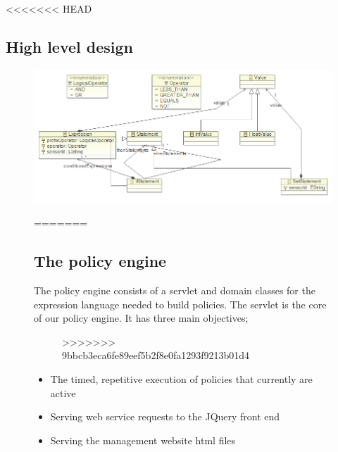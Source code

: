 <<<<<<< HEAD
\subsection{High level design}
\begin{figure}[t]
\includegraphics[width=1.00\columnwidth]{model.png}
\caption{Model}
=======
\subsection{The policy engine}
The policy engine consists of a servlet and domain classes for the expression language needed to build policies. The servlet is the core of our policy engine. It has three main objectives;

\begin{figure}[b]
>>>>>>> 9bbcb3eca6fe89eef5b2f8e0fa1293f9213b01d4
\end{figure}

\begin{itemize}
	\item The timed, repetitive execution of policies that currently are active
	\item Serving web service requests to the JQuery front end
	\item Serving the management website html files
\end{itemize}


\end{figure}
